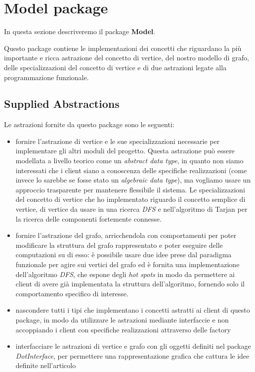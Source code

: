 
\newpage
\section{Model package}

In questa sezione descriveremo il package \textbf{Model}.

Questo package contiene le implementazioni dei concetti che riguardano
la pi\`u importante e ricca astrazione del concetto di vertice, del
nostro modello di grafo, delle specializzazioni del concetto di
vertice e di due astrazioni legate alla programmazione funzionale.

\subsection{Supplied Abstractions}

Le astrazioni fornite da questo package sono le seguenti:
\begin{itemize}
\label{itemize:model-supplied-abstraction}
\item fornire l'astrazione di vertice e le sue specializzazioni
  necessarie per implementare gli altri moduli del progetto. Questa
  astrazione pu\`o essere modellata a livello teorico come un
  \emph{abstract data type}, in quanto non siamo interessati che i
  client siano a conoscenza delle specifiche realizzazioni (come
  invece lo sarebbe se fosse stato un \emph{algebraic data type}), ma
  vogliamo usare un approccio trasparente per mantenere flessibile il
  sistema. Le specializzazioni del concetto di vertice che ho
  implementato riguardo il concetto semplice di vertice, di vertice da
  usare in una ricerca \emph{DFS} e nell'algoritmo di Tarjan per la
  ricerca delle componenti fortemente connesse.
\item fornire l'astrazione del grafo, arricchendola con comportamenti
  per poter modificare la struttura del grafo rappresentato e poter
  eseguire delle computazioni su di esso: \`e possibile usare due idee
  prese dal paradigma funzionale per agire sui vertici del grafo ed
  \`e fornita una implementazione dell'algoritmo \emph{DFS}, che espone
  degli \emph{hot spots} in modo da permettere ai client di avere
  gi\`a implementata la struttura dell'algoritmo, fornendo solo il
  comportamento specifico di interesse.
\item nascondere tutti i tipi che implementano i concetti astratti ai
  client di questo package, in modo da utilizzare le astrazioni
  mediante interfaccie e non accoppiando i client con specifiche
  realizzazioni attraverso delle factory 
\item interfacciare le astrazioni di vertice e grafo con gli oggetti
  definiti nel package \emph{DotInterface}, per permettere una
  rappresentazione grafica che cattura le idee definite nell'articolo
  \cite{tellingStories}
\end{itemize}


